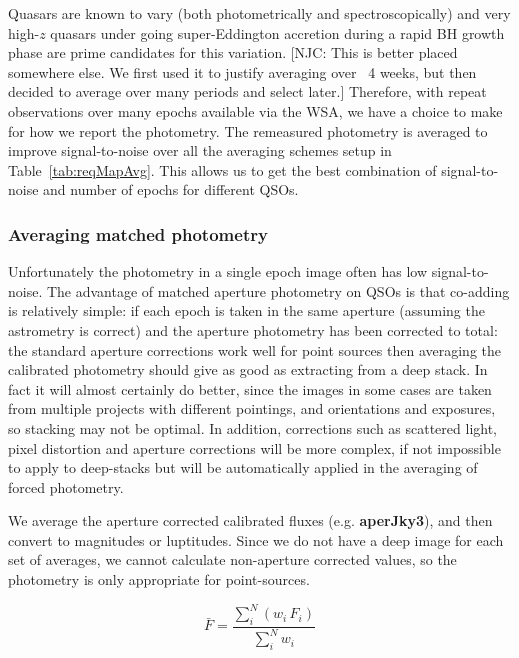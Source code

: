 \documentclass[usenatbib]{mnras}
\begin{document}
    Quasars are known to vary (both photometrically and spectroscopically)
and very high-$z$ quasars under going super-Eddington accretion during
a rapid BH growth phase are prime candidates for this variation. [NJC: This is better placed somewhere else. We first used it to justify averaging over ~4 weeks, but then decided to average over many periods and select later.]
Therefore, with repeat observations over many epochs available via the
WSA, we have a choice to make for how we report the photometry. The remeasured photometry is averaged to
improve signal-to-noise over all the averaging schemes setup in Table~\ref{tab:reqMapAvg}. This allows us to get the best combination of signal-to-noise and number of epochs for different QSOs.

    
    \subsubsection{Averaging matched photometry}
    Unfortunately the photometry in a single epoch image often has low
    signal-to-noise. The advantage of matched aperture photometry on QSOs is that
    co-adding is relatively simple: if each epoch is taken in the same aperture
    (assuming the astrometry is correct) and the aperture photometry has been
    corrected to total: the standard aperture corrections work well for point
    sources then averaging the calibrated photometry should give as good as
    extracting from a deep stack. In fact it will almost certainly do better, since
    the images in some cases are taken from multiple projects with different
    pointings, and orientations and exposures, so stacking may not be optimal. 
    In addition, corrections such as scattered light, pixel distortion
    and aperture corrections will be more complex, if not impossible to apply to
    deep-stacks but will be automatically applied in the averaging of forced
    photometry. 
    
    We average the aperture corrected calibrated fluxes (e.g. {\bf aperJky3}), and
    then convert to magnitudes or luptitudes. Since we do not have a deep image for
    each set of averages, we cannot calculate non-aperture corrected values, so the
    photometry is only appropriate for point-sources. 
    
    \begin{equation}
      \bar{F} = \frac{\sum_i^N (w_i\,F_i)}{\sum_i^N w_i}  
      \label{eq:avg}
    \end{equation}
    
\end{document}
